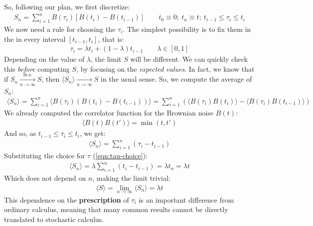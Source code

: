 \documentclass[../template.tex]{subfiles}
\begin{document}
\begin{example}
    So, following our plan, we first discretize:
    \begin{align}
        S_n = \sum_{i=1}^n B(\tau_i) [B(t_i) - B(t_{i-1})] \qquad t_0 \equiv 0;\> t_n \equiv t; \> t_{i-1} \leq \tau_i \leq t_{i}
        \label{eqn:Sn1}
    \end{align} 
    We now need a rule for choosing the $\tau_i$. The simplest possibility is to fix them in the  in every interval $[t_{i-1}, t_i]$, that is:
    \begin{align}
        \tau_i = \lambda t_i + (1- \lambda) t_{i-1} \qquad \lambda\in [0,1]
        \label{eqn:tau-choice}
    \end{align}
    Depending on the value of $\lambda$, the limit $S$ will be different. We can quickly check this \textit{before} computing $S$, by focusing on the \textit{expected values}. In fact, we know that if $S_n  \xrightarrow[n \to \infty]{\mathrm{m.s.}} S$, then $\langle S_n \rangle  \xrightarrow[n \to \infty]{}  S$ in the usual sense. So, we compute the average of $S_n$:
    \begin{align*}
        \langle S_n \rangle = \sum_{i=1}^{n} \langle B(\tau_i) (B(t_i) - B(t_{i-1})) \rangle = \sum_{i=1}^n (\langle B(\tau_i) B(t_i)  \rangle - \langle B(\tau_i) B(t_{i-1}) \rangle)
    \end{align*}
    We already computed the correlator function for the Brownian noise $B(t)$:
    \begin{align}
        \langle B(t) B(t') \rangle = \min(t,t')
        \label{eqn:correlator}
    \end{align}
    And so, as $t_{i-1} \leq \tau_i \leq t_i$, we get: 
    \begin{align*}
        \langle S_n \rangle = \sum_{i=1}^n (\tau_i - t_{i-1})
    \end{align*}
    Substituting the choice for $\tau$ (\ref{eqn:tau-choice}):
    \begin{align*}
        \langle S_n \rangle = \lambda \sum_{i=1}^n (t_i -t_{i-1}) = \lambda t_n = \lambda t  
    \end{align*} 
    Which does not depend on $n$, making the limit trivial:
    \begin{align*}
        \langle S \rangle = \lim_{n \to\infty } \langle S_n \rangle = \lambda t 
    \end{align*}  
    This dependence on the \textbf{prescription} of $\tau_i$ is an important difference from ordinary calculus, meaning that many common results cannot be directly translated to stochastic calculus.


\end{example}
\end{document}
